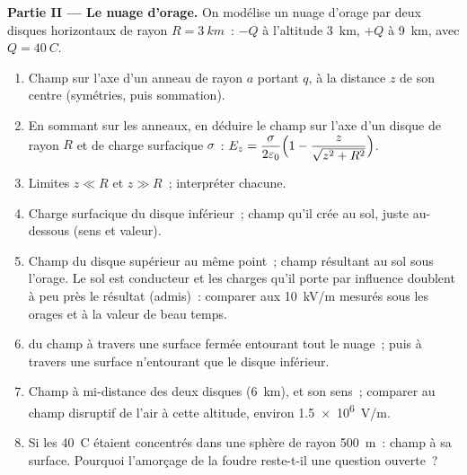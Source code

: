 \begin{problem}
\medskip
\noindent\textbf{Partie II --- Le nuage d'orage.}
On modélise un nuage d'orage par deux disques horizontaux de rayon $R = \qty{3}{km}$~:
$-Q$ à l'altitude \qty{3}{km}, $+Q$ à \qty{9}{km}, avec $Q = \qty{40}{C}$.
\begin{enumerate}[resume]
  \item Champ sur l'axe d'un anneau de rayon $a$ portant $q$, à la distance
        $z$ de son centre (symétries, puis sommation).
  \item En sommant sur les anneaux, en déduire le champ sur l'axe d'un disque
        de rayon $R$ et de charge surfacique $\sigma$~:
        $E_z = \dfrac{\sigma}{2\varepsilon_0}\Bigl(1 - \dfrac{z}{\sqrt{z^2 + R^2}}\Bigr)$.
  \item Limites $z \ll R$ et $z \gg R$~; interpréter chacune.
  \item Charge surfacique du disque inférieur~; champ qu'il crée au sol, juste
        au-dessous (sens et valeur).
  \item Champ du disque supérieur au même point~; champ résultant au sol sous
        l'orage. Le sol est conducteur et les charges qu'il porte par
        influence doublent à peu près le résultat (admis)~: comparer aux
        \qty{10}{kV/m} mesurés sous les orages et à la valeur de beau temps.
  \item {} du champ à travers une surface fermée entourant tout le nuage~;
        puis à travers une surface n'entourant que le disque inférieur.
  \item Champ à mi-distance des deux disques (\qty{6}{km}), et son sens~;
        comparer au champ disruptif de l'air à cette altitude, environ
        \qty{1.5e6}{V/m}.
  \item Si les \qty{40}{C} étaient concentrés dans une sphère de rayon
        \qty{500}{m}~: champ à sa surface. Pourquoi l'amorçage de la foudre
        reste-t-il une question ouverte~?
\end{enumerate}


\end{problem}

